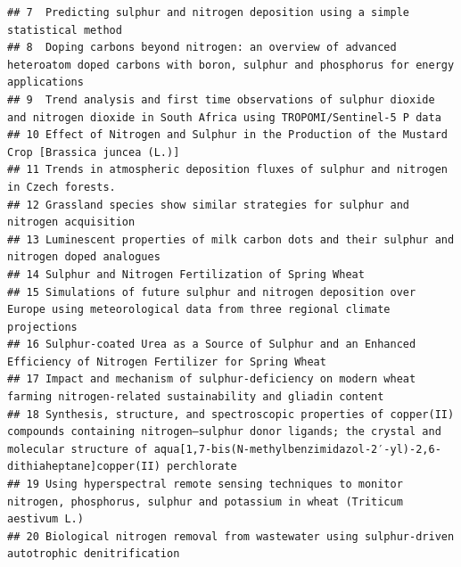 \documentclass[
]{article}
\begin{document}
\begin{verbatim}
## 7  Predicting sulphur and nitrogen deposition using a simple statistical method                                                                                                                                                                  
## 8  Doping carbons beyond nitrogen: an overview of advanced heteroatom doped carbons with boron, sulphur and phosphorus for energy applications                                                                                                   
## 9  Trend analysis and first time observations of sulphur dioxide and nitrogen dioxide in South Africa using TROPOMI/Sentinel-5 P data                                                                                                            
## 10 Effect of Nitrogen and Sulphur in the Production of the Mustard Crop [Brassica juncea (L.)]                                                                                                                                                   
## 11 Trends in atmospheric deposition fluxes of sulphur and nitrogen in Czech forests.                                                                                                                                                             
## 12 Grassland species show similar strategies for sulphur and nitrogen acquisition                                                                                                                                                                
## 13 Luminescent properties of milk carbon dots and their sulphur and nitrogen doped analogues                                                                                                                                                     
## 14 Sulphur and Nitrogen Fertilization of Spring Wheat                                                                                                                                                                                            
## 15 Simulations of future sulphur and nitrogen deposition over Europe using meteorological data from three regional climate projections                                                                                                           
## 16 Sulphur-coated Urea as a Source of Sulphur and an Enhanced Efficiency of Nitrogen Fertilizer for Spring Wheat                                                                                                                                 
## 17 Impact and mechanism of sulphur-deficiency on modern wheat farming nitrogen-related sustainability and gliadin content                                                                                                                        
## 18 Synthesis, structure, and spectroscopic properties of copper(II) compounds containing nitrogen–sulphur donor ligands; the crystal and molecular structure of aqua[1,7-bis(N-methylbenzimidazol-2′-yl)-2,6-dithiaheptane]copper(II) perchlorate
## 19 Using hyperspectral remote sensing techniques to monitor nitrogen, phosphorus, sulphur and potassium in wheat (Triticum aestivum L.)                                                                                                          
## 20 Biological nitrogen removal from wastewater using sulphur-driven autotrophic denitrification
\end{verbatim}
\end{document}
